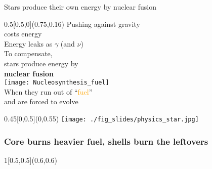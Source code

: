 \documentclass[xcolor=dvipsnames,professionalfonts, aspectratio=169]{beamer}
\begin{document}
\begin{frame}{\textcolor{whiteish}{Stars produce their own energy by nuclear fusion}}

      \begin{textblock}{0.5}[0.5,0](0.75,0.16)
        \centering
        \textcolor{whiteish}{Pushing against gravity \\
          costs energy}\\[10pt]
        \textcolor{whiteish}{Energy leaks as $\gamma$ (and $\nu$)\\[10pt]
          To compensate,\\
          stars produce energy by\\
          \textbf{nuclear fusion}\\[10pt]
          \texttt{[image: Nucleosynthesis\_fuel]}\\
          When they run out of ``\textcolor{Orange}{fuel}'' \\
          and are forced to evolve}
      \end{textblock}

    \begin{textblock}{0.45}[0,0.5](0,0.55)
      \texttt{[image: ./fig\_slides/physics\_star.jpg]}
    \end{textblock}
\end{frame}
\egroup

\begin{frame}[c]
  \frametitle{Core burns heavier fuel, shells burn the leftovers}
  \begin{textblock}{1}[0.5,0.5](0.6,0.6)
    \centering
     
  \end{textblock}

\end{frame}
\end{document}

